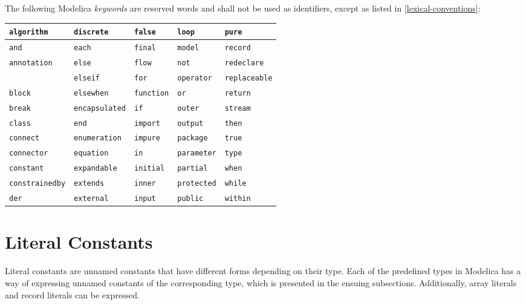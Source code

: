 The following Modelica \emph{keywords} are reserved words and shall not be
used as identifiers, except as listed in \cref{lexical-conventions}:
\begin{center}
\begin{tabular}{l l l l l}
\lstinline!algorithm! & \lstinline!discrete! & \lstinline!false! & \lstinline!loop! & \lstinline!pure!\\ \hline
\lstinline!and! & \lstinline!each! & \lstinline!final! & \lstinline!model! & \lstinline!record!\\ \hline
\lstinline!annotation! & \lstinline!else! & \lstinline!flow! & \lstinline!not! & \lstinline!redeclare!\\ \hline
& \lstinline!elseif! & \lstinline!for! & \lstinline!operator! & \lstinline!replaceable!\\ \hline
\lstinline!block! & \lstinline!elsewhen! & \lstinline!function! & \lstinline!or! & \lstinline!return!\\ \hline
\lstinline!break! & \lstinline!encapsulated! & \lstinline!if! & \lstinline!outer! & \lstinline!stream!\\ \hline
\lstinline!class! & \lstinline!end! & \lstinline!import! & \lstinline!output! & \lstinline!then!\\ \hline
\lstinline!connect! & \lstinline!enumeration! & \lstinline!impure! & \lstinline!package! & \lstinline!true!\\ \hline
\lstinline!connector! & \lstinline!equation! & \lstinline!in! & \lstinline!parameter! & \lstinline!type!\\ \hline
\lstinline!constant! & \lstinline!expandable! & \lstinline!initial! & \lstinline!partial! & \lstinline!when!\\ \hline
\lstinline!constrainedby! & \lstinline!extends! & \lstinline!inner! & \lstinline!protected! & \lstinline!while!\\ \hline
\lstinline!der! & \lstinline!external! & \lstinline!input! & \lstinline!public! & \lstinline!within!\\
\end{tabular}
\end{center}

\section{Literal Constants}\label{literal-constants}

Literal constants are unnamed constants that have different forms
depending on their type. Each of the predefined types in Modelica has a
way of expressing unnamed constants of the corresponding type, which is
presented in the ensuing subsections. Additionally, array literals and
record literals can be expressed.

